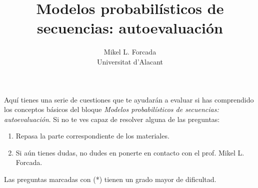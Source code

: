 \documentclass[12pt,a4paper]{article}
\begin{document}
 
\title{Modelos probabilísticos de secuencias: autoevaluación}
\author{Mikel L. Forcada \\
Universitat d'Alacant \\}

\maketitle

Aquí tienes una serie de cuestiones que te ayudarán a evaluar si has
comprendido los conceptos básicos del bloque \emph{Modelos
  probabilísticos de secuencias: autoevaluación}. Si no te ves capaz
de resolver alguna de las preguntas:
\begin{enumerate}
\item Repasa la parte correspondiente de los materiales.
\item Si aún tienes dudas, no dudes en ponerte en contacto con el prof. Mikel L. Forcada.
\end{enumerate}
Las preguntas marcadas con (*) tienen un grado mayor de dificultad.
\end{document}
